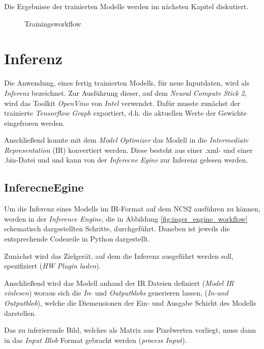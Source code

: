 Die Ergebnisse der trainierten Modelle 
werden im nächsten Kapitel diskutiert.
\vspace{1cm}

\begin{figure}[H]
    \centering
    
    \caption{Trainingsworkflow}
    \label{fig:train_workflow}
\end{figure}
\vspace{1cm}


\section{Inferenz}\label{sec:inferenz}

Die Anwendung, eines fertig trainierten Modells, für 
neue Inputdaten, wird als \textit{Inferenz} bezeichnet.
Zur Ausführung dieser, auf dem \textit{Neural Compute Stick 2}, 
wird das Toolkit \textit{OpenVino} von \textit{Intel} verwendet.
Dafür musste zunächst der trainierte \textit{Tensorflow Graph} 
exportiert, d.h. die aktuellen Werte der Gewichte 
eingefroren werden.

Anschließend konnte mit dem \textit{Model Optimizer}
das Modell in die \textit{Intermediate Representation} (IR)
konvertiert werden.
Diese besteht aus einer .xml- und einer .bin-Datei und 
und kann von der \textit{Inferecne Egine} 
zur Inferenz gelesen werden.


\subsection*{InferecneEgine}

Um die Inferenz eines Modells im IR-Format 
auf dem NCS2 ausführen zu können, werden 
in der \textit{Inference Engine}, die in Abbildung 
\ref{fig:inger_engine_workflow} schematisch
dargestellten Schritte, durchgeführt.
Daneben ist jeweils die entsprechende 
Codezeile in Python dargestellt.

Zunächst wird das Zielgerät, auf dem 
die Inferenz ausgeführt werden soll,
spezifiziert (\textit{HW Plugin laden}).

Anschließend wird das Modell anhand der 
IR Dateien definiert (\textit{Model IR einlesen})
woraus sich die \textit{In}- und \textit{Outputblobs}
 generieren lassen, (\textit{In-und Outputblob}), 
welche die Diemensionen der Ein- und Ausgabe 
Schicht des Modells darstellen.

Das zu inferierende Bild,
welches als Matrix aus Pixelwerten 
vorliegt, muss dann in das \textit{Input Blob}
Format gebracht werden (\textit{process Input}).

